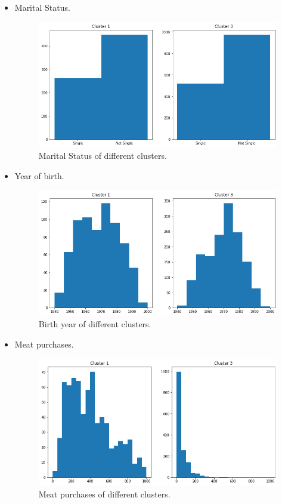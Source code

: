 \documentclass[11pt]{article}
\begin{document}
\begin{itemize}
\item Marital Status.

\begin{figure}[h!]
\centerline{\includegraphics[scale=0.35]{clu_conc_3.png}}
\caption{Marital Status of different clusters.}
\end{figure}

\item Year of birth.

\begin{figure}[h!]
\centerline{\includegraphics[scale=0.35]{clu_conc_4.png}}
\caption{Birth year of different clusters.}
\end{figure}

\item Meat purchases.

\begin{figure}[h!]
\centerline{\includegraphics[scale=0.35]{clu_conc_5.png}}
\caption{Meat purchases of different clusters.}
\end{figure}


\end{itemize}
\end{document}
